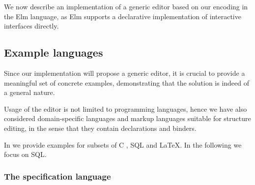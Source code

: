 \documentclass[sigplan,review]{acmart}
\begin{document}
We now describe an implementation of a generic editor based on our
encoding in the Elm language, as Elm supports a declarative
implementation of interactive interfaces directly.

\subsection{Example languages}

Since our implementation will propose a generic editor, it is crucial
to provide a meaningful set of concrete examples, demonstrating that
the solution is indeed of a general nature.  %


Usage of the editor is not limited to programming languages, hence we
have also considered domain-specific languages and markup languages
suitable for structure editing, in the sense that they contain
declarations and binders.

In \cite{sunemsc} we provide examples for subsets of C
\cite{c-iso-standard}, SQL\cite{postgresql-about} and
\LaTeX\cite{latex-about}. In the following we focus on SQL.




\subsubsection{The specification language}
\end{document}
